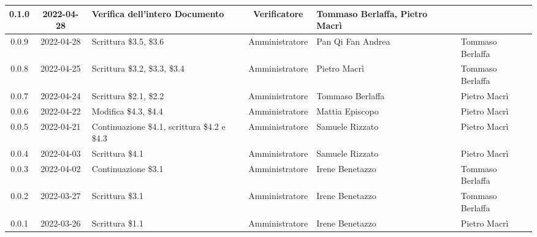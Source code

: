 \begin{center}
\begin{longtable}{ |c|c|p{8em}|c|m{5em}|m{6em}| }
	\hline
	0.1.0 & 2022-04-28 & Verifica dell'intero Documento & Verificatore & Tommaso Berlaffa, \newline Pietro Macrì & \\
	\hline
	0.0.9 & 2022-04-28 & Scrittura \newline \$3.5, \$3.6 & Amministratore & Pan Qi Fan \newline Andrea & Tommaso \newline Berlaffa\\
	\hline
	0.0.8 & 2022-04-25 & Scrittura \newline \$3.2, \$3.3, \$3.4 & Amministratore& Pietro \newline Macrì & Tommaso \newline Berlaffa\\
	\hline
	0.0.7 & 2022-04-24 & Scrittura \newline \$2.1, \$2.2 & Amministratore & Tommaso \newline Berlaffa & Pietro \newline Macrì\\
	\hline
	0.0.6 & 2022-04-22 & Modifica \newline \$4.3, \$4.4 & Amministratore & Mattia \newline Episcopo & Pietro \newline Macrì\\
	\hline
	0.0.5 & 2022-04-21 & Continuazione \$4.1, scrittura \$4.2 e \$4.3 & Amministratore & Samuele \newline Rizzato & Pietro \newline Macrì\\
	\hline
	0.0.4 & 2022-04-03 & Scrittura \$4.1 & Amministratore & Samuele \newline Rizzato & Pietro \newline Macrì\\
	\hline
	0.0.3 & 2022-04-02 & Continuazione \$3.1 & Amministratore & Irene \newline Benetazzo & Tommaso \newline Berlaffa \\
	\hline
	0.0.2 & 2022-03-27 & Scrittura \$3.1 & Amministratore & Irene \newline Benetazzo & Tommaso \newline Berlaffa \\
	\hline
	0.0.1 & 2022-03-26 & Scrittura \$1.1 & Amministratore & Irene \newline Benetazzo & Pietro \newline Macrì \\
	\hline
	\end{longtable}
	\end{center}
	\newpage